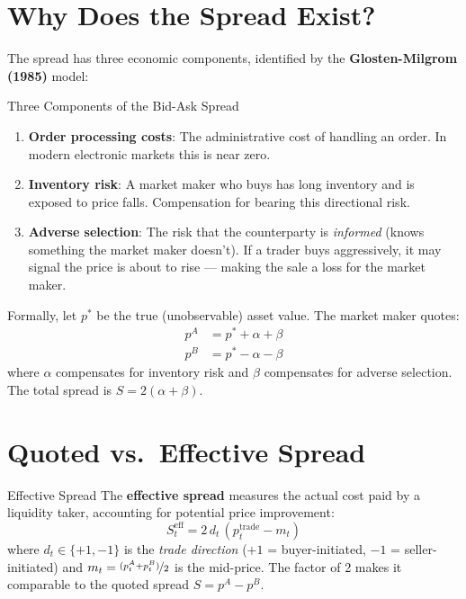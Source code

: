 \documentclass[12pt,a4paper,openany]{report}
\theoremstyle{definition}
\begin{document}
\section{Why Does the Spread Exist?}

The spread has three economic components, identified by the \textbf{Glosten-Milgrom (1985)} model:

\begin{keyconceptbox}{Three Components of the Bid-Ask Spread}
\begin{enumerate}[label=\arabic*.]
  \item \textbf{Order processing costs}: The administrative cost of handling an order. In modern electronic markets this is near zero.
  \item \textbf{Inventory risk}: A market maker who buys has long inventory and is exposed to price falls. Compensation for bearing this directional risk.
  \item \textbf{Adverse selection}: The risk that the counterparty is \emph{informed} (knows something the market maker doesn't). If a trader buys aggressively, it may signal the price is about to rise — making the sale a loss for the market maker.
\end{enumerate}
\end{keyconceptbox}

Formally, let $p^*$ be the true (unobservable) asset value. The market maker quotes:
\begin{align}
  p^A &= p^* + \alpha + \beta \\
  p^B &= p^* - \alpha - \beta
\end{align}
where $\alpha$ compensates for inventory risk and $\beta$ compensates for adverse selection. The total spread is $S = 2(\alpha + \beta)$.

\section{Quoted vs.\ Effective Spread}

\begin{definitionbox}{Effective Spread}
The \textbf{effective spread} measures the actual cost paid by a liquidity taker, accounting for potential price improvement:
\[
  S^{\text{eff}}_t = 2 \, d_t \, (p_t^{\text{trade}} - m_t)
\]
where $d_t \in \{+1, -1\}$ is the \emph{trade direction} ($+1$ = buyer-initiated, $-1$ = seller-initiated) and $m_t = \nicefrac{(p^A_t + p^B_t)}{2}$ is the mid-price. The factor of 2 makes it comparable to the quoted spread $S = p^A - p^B$.
\end{definitionbox}
\end{document}
